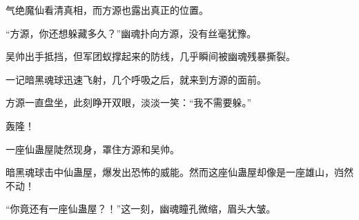 \begin{this_body}
气绝魔仙看清真相，而方源也露出真正的位置。

“方源，你还想躲藏多久？”幽魂扑向方源，没有丝毫犹豫。

吴帅出手抵挡，但军团蚁撑起来的防线，几乎瞬间被幽魂残暴撕裂。

一记暗黑魂球迅速飞射，几个呼吸之后，就来到方源的面前。

方源一直盘坐，此刻睁开双眼，淡淡一笑：“我不需要躲。”

轰隆！

一座仙蛊屋陡然现身，罩住方源和吴帅。

暗黑魂球击中仙蛊屋，爆发出恐怖的威能。然而这座仙蛊屋却像是一座雄山，岿然不动！

“你竟还有一座仙蛊屋？！”这一刻，幽魂瞳孔微缩，眉头大皱。

\end{this_body}

